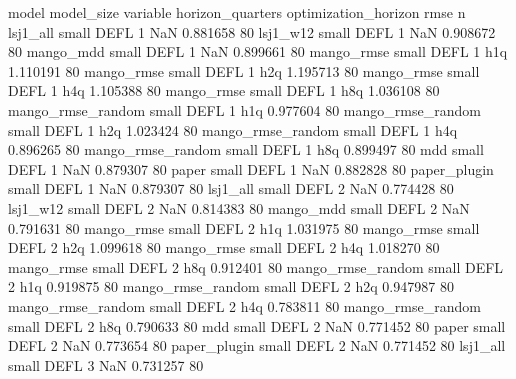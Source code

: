             model model_size variable  horizon_quarters optimization_horizon     rmse  n
         lsj1_all      small     DEFL                 1                  NaN 0.881658 80
         lsj1_w12      small     DEFL                 1                  NaN 0.908672 80
        mango_mdd      small     DEFL                 1                  NaN 0.899661 80
       mango_rmse      small     DEFL                 1                  h1q 1.110191 80
       mango_rmse      small     DEFL                 1                  h2q 1.195713 80
       mango_rmse      small     DEFL                 1                  h4q 1.105388 80
       mango_rmse      small     DEFL                 1                  h8q 1.036108 80
mango_rmse_random      small     DEFL                 1                  h1q 0.977604 80
mango_rmse_random      small     DEFL                 1                  h2q 1.023424 80
mango_rmse_random      small     DEFL                 1                  h4q 0.896265 80
mango_rmse_random      small     DEFL                 1                  h8q 0.899497 80
              mdd      small     DEFL                 1                  NaN 0.879307 80
            paper      small     DEFL                 1                  NaN 0.882828 80
     paper_plugin      small     DEFL                 1                  NaN 0.879307 80
         lsj1_all      small     DEFL                 2                  NaN 0.774428 80
         lsj1_w12      small     DEFL                 2                  NaN 0.814383 80
        mango_mdd      small     DEFL                 2                  NaN 0.791631 80
       mango_rmse      small     DEFL                 2                  h1q 1.031975 80
       mango_rmse      small     DEFL                 2                  h2q 1.099618 80
       mango_rmse      small     DEFL                 2                  h4q 1.018270 80
       mango_rmse      small     DEFL                 2                  h8q 0.912401 80
mango_rmse_random      small     DEFL                 2                  h1q 0.919875 80
mango_rmse_random      small     DEFL                 2                  h2q 0.947987 80
mango_rmse_random      small     DEFL                 2                  h4q 0.783811 80
mango_rmse_random      small     DEFL                 2                  h8q 0.790633 80
              mdd      small     DEFL                 2                  NaN 0.771452 80
            paper      small     DEFL                 2                  NaN 0.773654 80
     paper_plugin      small     DEFL                 2                  NaN 0.771452 80
         lsj1_all      small     DEFL                 3                  NaN 0.731257 80
